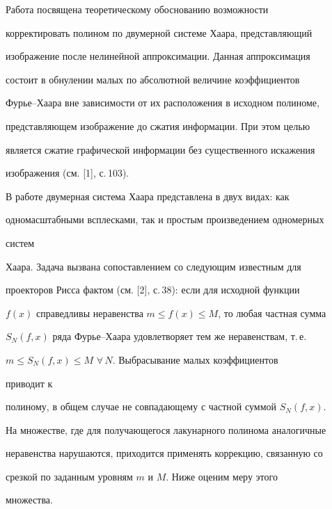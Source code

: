 \label{begin} 


 


 


Работа посвящена теоретическому обоснованию возможности 


корректировать полином по двумерной системе Хаара, представляющий 


изображение после нелинейной аппроксимации. Данная аппроксимация 


состоит в обнулении малых по абсолютной величине коэффициентов 


Фурье--Хаара вне зависимости от их расположения в исходном полиноме, 


представляющем изображение до сжатия информации. При этом целью 


является сжатие графической информации без существенного искажения 


изображения (см. [1], с.\,103). 


 


В работе двумерная система Хаара представлена в двух видах: как 


одномасштабными всплесками, так и простым произведением одномерных 


систем 


Хаара. Задача вызвана сопоставлением со следующим известным для 


проекторов Рисса фактом (см. [2], с.\,38): если для исходной функции 


$f(x)$ справедливы неравенства $m\le f(x)\le M$, то любая частная сумма 


$S_N(f,x)$ ряда Фурье--Хаара удовлетворяет тем же неравенствам, т.\,е. 


$m\le S_N(f,x)\le M$ $\forall\,N$. Выбрасывание малых коэффициентов 


приводит к 


полиному, в общем случае не совпадающему с частной суммой $S_N(f,x)$. 


На множестве, где для получающегося лакунарного полинома аналогичные 


неравенства нарушаются, приходится применять коррекцию, связанную со 


срезкой по заданным уровням $m$ и $M$. Ниже оценим меру этого 


множества. 


\medskip 


 


